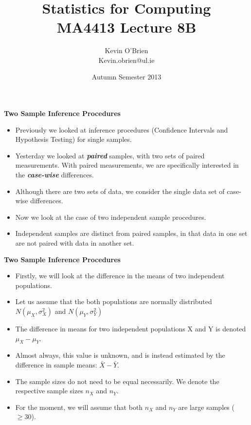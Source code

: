 \documentclass[a4]{beamer}
\title[MA4413]{Statistics for Computing \\ {\normalsize MA4413 Lecture 8B}}
\author[Kevin O'Brien]{Kevin O'Brien \\ {\scriptsize Kevin.obrien@ul.ie}}
\date{Autumn Semester 2013}
\institute[Maths \& Stats]{Dept. of Mathematics \& Statistics, \\ University \textit{of} Limerick}
\begin{document}
\titlepage





\noindent \textbf{Two Sample Inference Procedures}
\begin{itemize}
\item Previously we looked at inference procedures (Confidence Intervals and Hypothesis Testing) for single samples.
\item Yesterday we looked at \textit{\textbf{paired}} samples, with two sets of paired measurements. With paired measurements, we are specifically interested in the \textbf{\textit{case-wise}} differences.
\item Although there are two sets of data, we consider the single data set of case-wise differences.
\item Now we look at the case of two independent sample procedures.
\item Independent samples are distinct from paired samples, in that data in one set are not paired with data in another set.
\end{itemize}



\noindent \textbf{Two Sample Inference Procedures}

\begin{itemize}
\item Firstly, we will look at the difference in the means of two independent populations.
\item Let us assume that the both populations are normally distributed $N(\mu_X,\sigma^2_X)$ and $N(\mu_Y,\sigma^2_Y)$
\item The difference in means for two independent populations X and Y is denoted $\mu_X - \mu_Y$.
\item Almost always, this value is unknown, and is instead estimated by the difference in sample means: $\bar{X} - \bar{Y}.$
\item The sample sizes do not need to be equal necessarily. We denote the respective sample sizes $n_X$ and $n_Y$.
\item For the moment, we will assume that both $n_X$ and $n_Y$ are large samples ($ \geq 30$).
\end{itemize}
\end{document}

